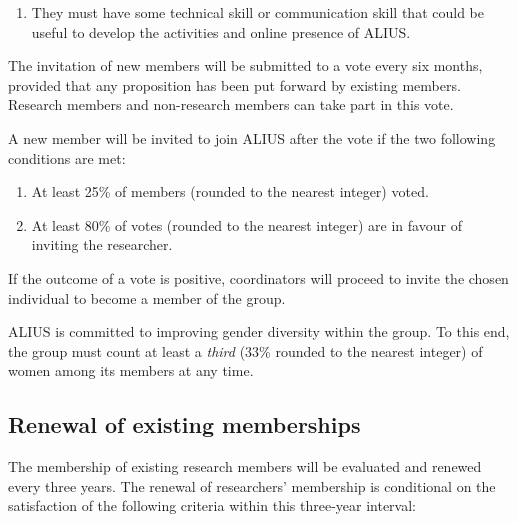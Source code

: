 \documentclass[a4paper, 11pt]{scrartcl}
\begin{document}
\begin{enumerate}

\item They must have some technical skill or communication skill that could be useful to develop the activities and online presence of ALIUS.

\end{enumerate}

\noindent The invitation of new members will be submitted to a vote every six months, provided that any proposition has been put forward by existing members. Research members and non-research members can take part in this vote.

A new member will be invited to join ALIUS after the vote if the two following conditions are met:

\begin{enumerate}
\item At least 25\% of members (rounded to the nearest integer) voted.
\item At least 80\% of votes (rounded to the nearest integer) are in favour of inviting the researcher.
\end{enumerate}

\noindent If the outcome of a vote is positive, coordinators will proceed to invite the chosen individual to become a member of the group.

ALIUS is committed to improving gender diversity within the group. To this end, the group must count at least a \emph{third} (33\% rounded to the nearest integer) of women among its members at any time.

\subsection{Renewal of existing memberships}
\label{membership_renewal}

The membership of existing research members will be evaluated and renewed every three years. The renewal of researchers' membership is conditional on the satisfaction of the following criteria within this three-year interval:
\end{document}
